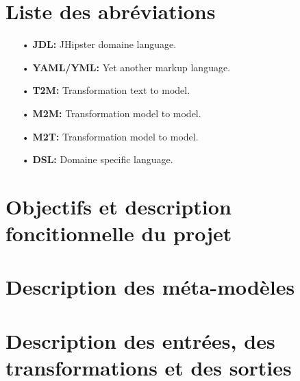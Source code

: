 \documentclass[]{report}
\author{Kotbi Abderrahmane, El Hafi Abdessamad}
\date{Februray 15th, 2022}
\begin{document}
\begin{doublespace}



\newpage

\setcounter{page}{1}

\tableofcontents

\newpage

\listoffigures
{}

\newpage

\chapter*{\centering Liste des abréviations}
\begin{itemize}
    \item[•] \textbf{JDL:} JHipster domaine language.
    \item[•] \textbf{YAML/YML:} Yet another markup language.
    \item[•] \textbf{T2M:} Transformation text to model.
    \item[•] \textbf{M2M:} Transformation model to model.
    \item[•] \textbf{M2T:} Transformation model to model.
    \item[•] \textbf{DSL:} Domaine specific language.
\end{itemize}

\newpage

\setcounter{page}{1}

\chapter{Objectifs et description foncitionnelle du projet}
\fancyhead[R]{\hspace*{5cm}}
	

\chapter{Description des méta-modèles}
\fancyhead[R]{\hspace*{5cm}}
	

\chapter{Description des entrées, des transformations et des sorties}
\fancyhead[R]{\hspace*{5cm}}
	

\end{doublespace}
\end{document}
